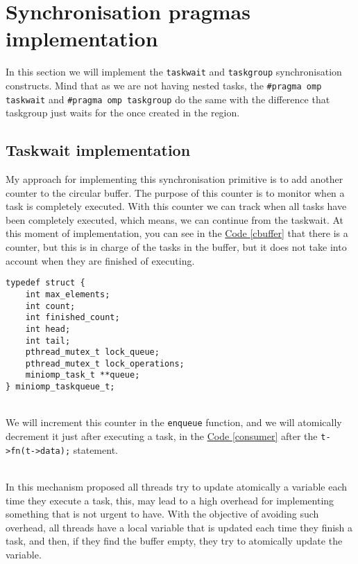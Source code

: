 \section{Synchronisation pragmas implementation}
In this section we will implement the \texttt{taskwait} and \texttt{taskgroup} synchronisation constructs. Mind that as we are not having nested tasks, the \texttt{\#pragma omp taskwait} and  \texttt{\#pragma omp taskgroup} do the same with the difference that taskgroup just waits for the once created in the region.

\subsection{Taskwait implementation}
My approach for implementing this synchronisation primitive is to add another counter to the circular buffer. The purpose of this counter is to monitor when a task is completely executed. With this counter we can track when all tasks have been completely executed, which means, we can continue from the taskwait. At this moment of implementation, you can see in the \hyperref[cbuffer]{Code \ref*{cbuffer}} that there is a counter, but this is in charge of the tasks in the buffer, but it does not take into account when they are finished of executing. 

\begin{lstlisting}[caption=New circular buffer declaration, label=ncbuffer]
typedef struct {
    int max_elements;
    int count;
    int finished_count;
    int head;
    int tail;
    pthread_mutex_t lock_queue;
    pthread_mutex_t lock_operations;
    miniomp_task_t **queue;
} miniomp_taskqueue_t;
\end{lstlisting}
\par ~\\
We will increment this counter in the \texttt{enqueue} function, and we will atomically decrement it just after executing a task, in the \hyperref[consumer]{Code \ref*{consumer}} after the \texttt{t->fn(t->data);} statement.

\par ~\\
In this mechanism proposed all threads try to update atomically a variable each time they execute a task, this, may lead to a high overhead for implementing something that is not urgent to have. With the objective of avoiding such overhead, all threads have a local variable that is updated each time they finish a task, and then, if they find the buffer empty, they try to atomically update the variable. 

